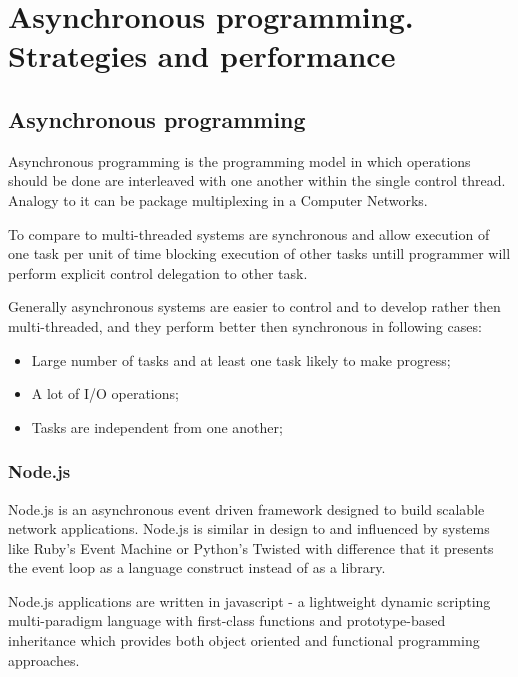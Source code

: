  \chapter{Asynchronous programming. Strategies and performance}
\section{Asynchronous programming}
Asynchronous programming is the programming model in which operations should be done are interleaved with one another within the single control thread. Analogy to it can be package multiplexing in a Computer Networks. 

To compare to multi-threaded systems are synchronous and allow execution of one task per unit of time blocking execution of other tasks untill programmer will perform explicit control delegation to other task.

Generally asynchronous systems are easier to control and to develop rather then multi-threaded, and  they perform better then synchronous in following cases\cite{asyncArticle}:
 \begin{itemize}
	\item Large number of tasks and at least one task likely to make progress;
	\item A lot of I/O operations;
	\item Tasks are independent from one another;
 \end{itemize}



\subsection{Node.js}
Node.js is an asynchronous event driven framework designed to build scalable network applications.
Node.js is similar in design to and influenced by systems like Ruby's Event Machine or Python's Twisted with difference that it presents the event loop as a language construct instead of as a library\cite{nodejsabout}.

Node.js applications are written in javascript - a lightweight dynamic scripting multi-paradigm language with first-class functions and prototype-based inheritance which provides both object oriented and functional programming approaches.

